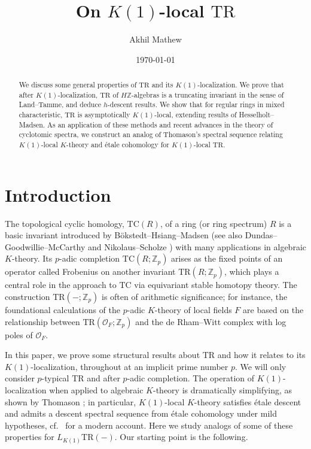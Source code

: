 \documentclass{amsart}
\theoremstyle{definition}
\newcommand{\TC}{\mathrm{TC}}
\begin{document}
\newcommand{\ksel}{K^{Sel}}
\newcommand{\qsyn}{\mathrm{QSyn}_{\mathbb{Z}}}
\newcommand{\cycsp}{\mathrm{CycSp}}
\newcommand{\cat}{\mathrm{Cat}}
\newcommand{\mot}{\mathrm{mot}}
\newcommand{\TR}{\mathrm{TR}}
\newcommand{\THH}{\mathrm{THH}}
\title{On $K(1)$-local $\TR$}
\author{Akhil Mathew}
\date{\today}
\address{Department of Mathematics, University of Chicago, 5734 S University
Ave, Chicago, IL 60605 USA}

\begin{abstract}
We discuss some general properties of $\TR$ and its $K(1)$-localization. We
prove that after $K(1)$-localization, $\TR$ of $H\mathbb{Z}$-algebras is a
truncating invariant in the sense of Land--Tamme, and deduce $h$-descent
results. We show that for regular rings in mixed characteristic, $\TR$ is
asymptotically $K(1)$-local, extending results of Hesselholt--Madsen.  As an application of these methods and recent advances in the theory
of cyclotomic spectra, 
we construct an analog of Thomason's spectral sequence relating $K(1)$-local
$K$-theory  and \'etale cohomology for $K(1)$-local $\TR$. 

\end{abstract}

\maketitle
\section{Introduction}
The topological cyclic homology, $\TC(R)$, of a ring (or ring spectrum) $R$
is a basic invariant 
introduced by B\"okstedt--Hsiang--Madsen \cite{BHM} 
(see also Dundas--Goodwillie--McCarthy \cite{DGM} and Nikolaus--Scholze
\cite{NS18})  with many
applications in algebraic $K$-theory. Its $p$-adic completion $\TC(R;
\mathbb{Z}_p)$ arises as the fixed points
of an operator called Frobenius on another invariant $\TR(R; \mathbb{Z}_p)$, which plays a
central role in the approach to $\TC$ via equivariant stable homotopy theory. 
The construction $\TR(-; \mathbb{Z}_p)$ is often of arithmetic significance; for instance, the
foundational calculations \cite{HM03, HM04, GH06} of the $p$-adic $K$-theory of local
fields $F$ are based on the relationship between $\TR(\mathcal{O}_F;
\mathbb{Z}_p)$ and the de
Rham--Witt complex with log poles of $\mathcal{O}_F$. 

In this paper, we prove some structural results about $\TR $ and how it
relates to its $K(1)$-localization, throughout at an implicit prime number $p$. 
We will only consider $p$-typical $\TR$ and after $p$-adic completion. 
The operation of $K(1)$-localization 
when applied to algebraic $K$-theory is dramatically simplifying, as shown by
Thomason \cite{Tho85, TT90}; in particular, $K(1)$-local $K$-theory satisfies
\'etale descent and admits a descent spectral sequence from \'etale cohomology under mild hypotheses, cf.~\cite{CM19}
for a modern account. 
Here we study analogs of some of these properties for $L_{K(1)} \TR(-)$. 
Our starting point is the following. 
\end{document}
